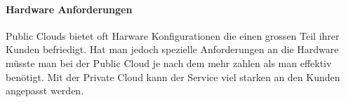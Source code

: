 \paragraph{Hardware Anforderungen} Public Clouds bietet oft Harware Konfigurationen die einen grossen Teil ihrer Kunden befriedigt. Hat man jedoch spezielle Anforderungen an die Hardware müsste man bei der Public Cloud je nach dem mehr zahlen als man effektiv benötigt. Mit der Private Cloud kann der Service viel starken an den Kunden angepasst werden.


